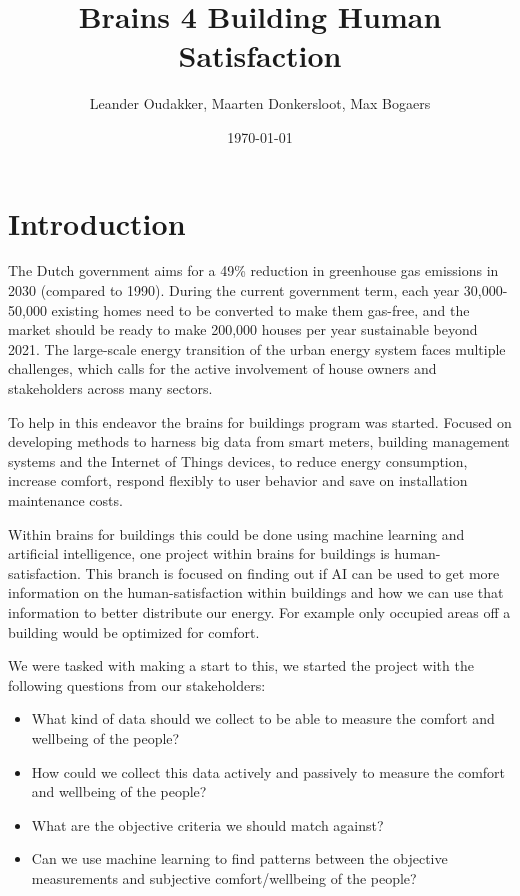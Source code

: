 \documentclass[12pt,a4paper]{article}
\title{Brains 4 Building Human Satisfaction}
\author{Leander Oudakker, Maarten Donkersloot, Max Bogaers}
\date{\today}
\begin{document}
	
\maketitle

\pagebreak

\tableofcontents

\pagebreak

\listoffigures

\pagebreak

\section{Introduction}
The Dutch government aims for a 49\% reduction in greenhouse gas emissions in 2030 (compared to 1990). During the current government term, each year 30,000-50,000 existing homes need to be converted to make them gas-free, and the market should be ready to make 200,000 houses per year sustainable beyond 2021. The large-scale energy transition of the urban energy system faces multiple challenges, which calls for the active involvement of house owners and stakeholders across many sectors. 

To help in this endeavor the brains for buildings program was started. Focused on developing methods to harness big data from smart meters, building management systems and the Internet of Things devices, to reduce energy consumption, increase comfort, respond flexibly to user behavior and save on installation maintenance costs.

Within brains for buildings this could be done using machine learning and artificial intelligence, one project within brains for buildings is human-satisfaction. This branch is focused on finding out if AI can be used to get more information on the human-satisfaction within buildings and how we can use that information to better distribute our energy. For example only occupied areas off a building would be optimized for comfort.

We were tasked with making a start to this, we started the project with the following questions from our stakeholders:

\begin{itemize}
	\item What kind of data should we collect to be able to measure the comfort and wellbeing of the people? 
	
	\item How could we collect this data actively and passively to measure the comfort and wellbeing of the people? 
	
	\item What are the objective criteria we should match against? 
	
	\item Can we use machine learning to find patterns between the objective measurements and subjective comfort/wellbeing of the people? 
\end{itemize}
\end{document}
